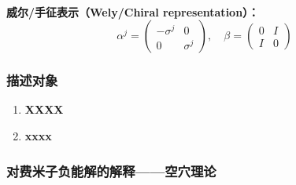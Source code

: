 \\\textbf{威尔/手征表示（Wely/Chiral representation）：}
\begin{equation}
\alpha^{j}=\left(\begin{array}{cc}
-\sigma^{j} & 0 \\
0 & \sigma^{j}
\end{array}\right), \quad \beta=\left(\begin{array}{cc}
0 & I \\
I & 0
\end{array}\right)
\end{equation}
\subsubsection{描述对象}
\begin{enumerate}
\item \textbf{XXXX}
\item \textbf{xxxx}
\end{enumerate}
\subsubsection{对费米子负能解的解释——空穴理论}


